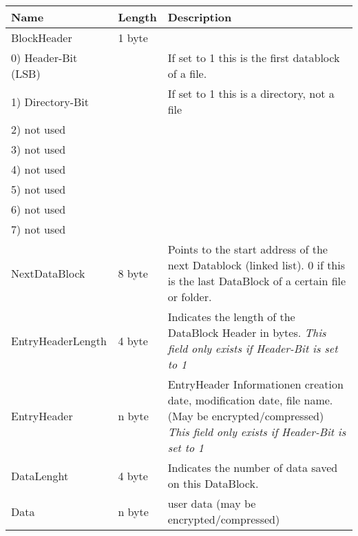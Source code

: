 \begin{tabular}{|l|l|p{5cm}|}
\hline
  \textbf{Name} & \textbf{Length} & \textbf{Description}
\\  \hline
 BlockHeader & 1 byte & 
 \\
 \hspace{0.2cm} 0) Header-Bit (LSB) & &  If set to 1 this is the first datablock
 of a file.
 \\ 
 \hspace{0.2cm} 1) Directory-Bit & &  If set to 1 this is a directory, not a file
 \\ 
 \hspace{0.2cm} 2) not used & &  
 \\ 
 \hspace{0.2cm} 3) not used & &  
 \\ 
 \hspace{0.2cm} 4) not used & &  
 \\ 
 \hspace{0.2cm} 5) not used & &  
 \\ 
 \hspace{0.2cm} 6) not used & &  
 \\ 
 \hspace{0.2cm} 7) not used & &  
 
\\  \hline
 NextDataBlock & 8 byte & 
 Points to the start address of the next Datablock (linked list).
    0 if this is the last DataBlock of a certain file or folder.
\\  \hline
  EntryHeaderLength & 4 byte & Indicates the length of the DataBlock Header in bytes.
  \newline \textit{This field only exists if Header-Bit is set to 1}
\\  \hline
  EntryHeader & 
  n byte &
  EntryHeader Informationen creation date, modification date, file name. (May be encrypted/compressed)
  \newline \textit{This field only exists if Header-Bit is set to 1}
\\  \hline
  DataLenght & 4 byte &
    Indicates the number of data saved on this DataBlock.
    
\\  \hline
 Data & n byte & user data (may be encrypted/compressed)
\\  \hline
\end{tabular}